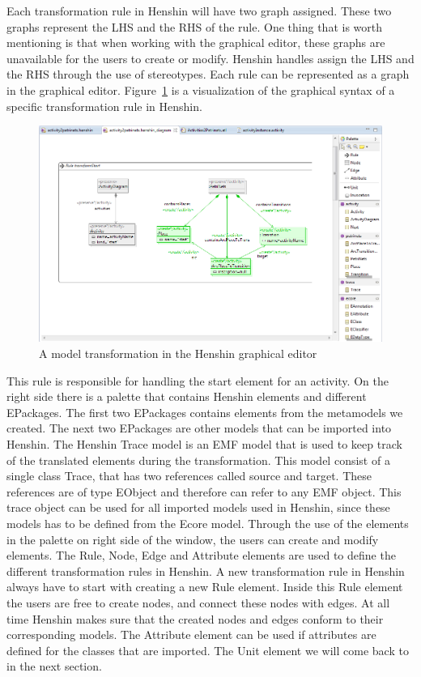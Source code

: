 Each transformation rule in Henshin will have two graph assigned.
These two graphs represent the LHS and the RHS of the rule. One thing that is worth mentioning is
that when working with the graphical editor, these graphs are unavailable for
the users to create or modify. Henshin handles assign the LHS and the RHS
through the use of stereotypes. Each rule can be represented as a graph in the
graphical editor. Figure~\ref{fig:HenshinScreen} is a visualization of the
graphical syntax of a specific transformation rule in Henshin.

\begin{figure}[H]
	\centering
	\includegraphics[scale=0.5]{figures/Henshin_Screen.png}
	\caption[The Henshin graphical editor]
	{A model transformation in the Henshin graphical editor}
	\label{fig:HenshinScreen}
\end{figure}

This rule is responsible for handling the start element for an activity.
On the right side there is a palette that contains Henshin elements and
different EPackages. The first two EPackages contains elements from the
metamodels we created. The next two EPackages are other models that can
be imported into Henshin. The Henshin Trace model is an EMF model that is used
to keep track of the translated elements during the transformation. This model
consist of a single class Trace, that has two references called source and
target. These references are of type EObject and therefore can refer to any EMF
object. This trace object can be used for all imported models used
in Henshin, since these models has to be defined from the Ecore model. Through
the use of the elements in the palette on right side of the window, the users
can create and modify elements. 
The Rule, Node, Edge and Attribute elements are used to define the different
transformation rules in Henshin. A new transformation rule in Henshin always
have to start with creating a new Rule element. Inside this Rule element the
users are free to create nodes, and connect these nodes with edges. At
all time Henshin makes sure that the created nodes and edges conform to their
corresponding models. The Attribute element can be used if attributes are
defined for the classes that are imported. The Unit element we will come back to
in the next section.

